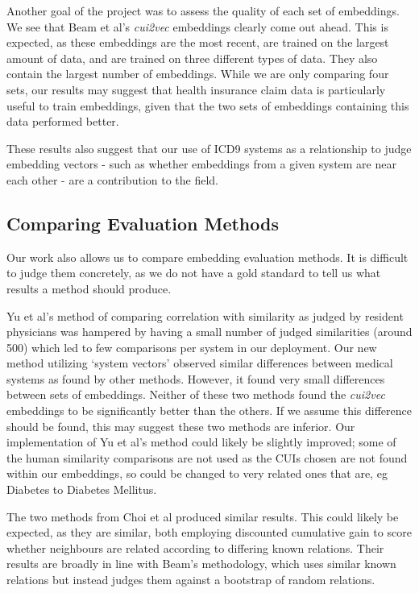 \documentclass[10pt]{article}
\begin{document}
Another goal of the project was to assess the quality of each set of embeddings. We see that Beam et al's \emph{cui2vec} embeddings clearly come out ahead. This is expected, as these embeddings are the most recent, are trained on the largest amount of data, and are trained on three different types of data. They also contain the largest number of embeddings. While we are only comparing four sets, our results may suggest that health insurance claim data is particularly useful to train embeddings, given that the two sets of embeddings containing this data performed better. 

These results also suggest that our use of ICD9 systems as a relationship to judge embedding vectors - such as whether embeddings from a given system are near each other - are a contribution to the field. 


\subsection{Comparing Evaluation Methods}
Our work also allows us to compare embedding evaluation methods. It is difficult to judge them concretely, as we do not have a gold standard to tell us what results a method should produce.

Yu et al's method of comparing correlation with similarity as judged by resident physicians was hampered by having a small number of judged similarities (around 500) which led to few comparisons per system in our deployment. Our new  method utilizing `system vectors' observed similar differences between medical systems as found by other methods. However, it found very small differences between sets of embeddings. Neither of these two methods found the \emph{cui2vec} embeddings to be significantly better than the others. If we assume this difference should be found, this may suggest these two methods are inferior. Our implementation of Yu et al's method could likely be slightly improved; some of the human similarity comparisons are not used as the CUIs chosen are not found within our embeddings, so could be changed to very related ones that are, eg Diabetes to Diabetes Mellitus.  

The two methods from Choi et al produced similar results. This could likely be expected, as they are similar, both employing discounted cumulative gain to score whether neighbours are related according to differing known relations. Their results are broadly in line with Beam's methodology, which uses similar known relations but instead judges them against a bootstrap of random relations. 
\end{document}
